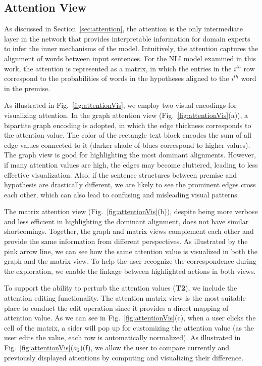 

\subsection{Attention View}
\label{sec:attentionView}
As discussed in Section~\ref{sec:attention}, the attention is the only intermediate layer in the network that provides interpretable information for domain experts to infer the inner mechanisms of the model.
%
Intuitively, the attention captures the alignment of words between input sentences. For the NLI model examined in this work, the attention is represented as a matrix, in which the entries in the $i^{th}$ row correspond to the probabilities of words in the hypotheses aligned to the $i^{th}$ word in the premise.

As illustrated in Fig.~\ref{fig:attentionVis}, we employ two visual encodings for visualizing attention. In the graph attention view (Fig.~\ref{fig:attentionVis}(a)), a bipartite graph encoding is adopted, in which the edge thickness corresponds to the attention value. The color of the rectangle text block encodes the sum of all edge values connected to it (darker shade of blues correspond to higher values).
%
The graph view is good for highlighting the most dominant alignments. However, if many attention values are high, the edges may become cluttered, leading to less effective visualization. Also, if the sentence structures between premise and hypothesis are drastically different, we are likely to see the prominent edges cross each other, which can also lead to confusing and misleading visual patterns.

The matrix attention view (Fig.~\ref{fig:attentionVis}(b)), despite being more verbose and less efficient in highlighting the dominant alignment, does not have similar shortcomings. Together, the graph and matrix views complement each other and provide the same information from different perspectives. As illustrated by the pink arrow line, we can see how the same attention value is visualized in both the graph and the matrix view.
To help the user recognize the correspondence during the exploration, we enable the linkage between highlighted actions in both views.

To support the ability to perturb the attention values (\textbf{T2}), we include the attention editing functionality. The attention matrix view is the most suitable place to conduct the edit operation since it provides a direct mapping of attention value.
As we can see in Fig.~\ref{fig:attentionVis}(c), when a user clicks the cell of the matrix, a sider will pop up for customizing the attention value (as the user edits the value, each row is automatically normalized).
%
As illustrated in Fig.~\ref{fig:attentionVis}($a_{2}$)(f), we allow the user to compare currently and previously displayed attentions by computing and visualizing their difference.


